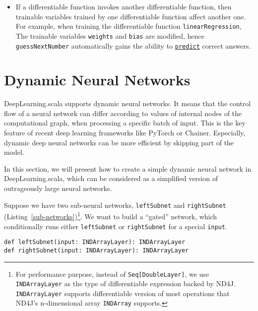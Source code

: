 \begin{itemize}
  \item If a \gls{differentiable function} invokes another \gls{differentiable function}, then \glspl{trainable variable} trained by one \gls{differentiable function} affect another one. For example, when training the \gls{differentiable function} \lstinline{linearRegression}, The \glspl{trainable variable} \lstinline{weights} and \lstinline{bias} are modified, hence \lstinline{guessNextNumber} automatically gains the ability to \href{https://javadoc.io/page/com.thoughtworks.deeplearning/deeplearning_2.11/latest/com/thoughtworks/deeplearning/DeepLearning.html#predict(differentiable:Differentiable):com.thoughtworks.future.Future[DeepLearning.this.Data]}{\lstinline{predict}} correct answers.
\end{itemize}

\section{Dynamic Neural Networks}

DeepLearning.scala supports dynamic neural networks. It means that the control flow of a neural network can differ according to values of internal nodes of the computational graph, when processing a specific batch of input. This is the key feature of recent deep learning frameworks like PyTorch\cite{paszke2017pytorch} or Chainer\cite{tokui2015chainer}. Especially, dynamic deep neural networks can be more efficient by skipping part of the model\cite{liu2017dynamic}.

In this section, we will present how to create a simple dynamic neural network in DeepLearning.scala, which can be considered as a simplified version of outrageously large neural networks\cite{shazeer2017outrageously}.

Suppose we have two sub-neural networks, \lstinline{leftSubnet} and \lstinline{rightSubnet} (Listing~\ref{sub-networks})\footnote{
  For performance purpose, instead of \lstinline{Seq[DoubleLayer]}, we use \lstinline{INDArrayLayer} as the type of \gls{differentiable expression} backed by ND4J. \lstinline{INDArrayLayer} supports differentiable version of most operations that ND4J's n-dimensional array \lstinline{INDArray} supports.
}. We want to build a ``gated'' network, which conditionally runs either \lstinline{leftSubnet} or \lstinline{rightSubnet} for a special \lstinline{input}.

\begin{lstlisting}[float={h t b p},caption={Predefined sub-networks},label={sub-networks}]
def leftSubnet(input: INDArrayLayer): INDArrayLayer
def rightSubnet(input: INDArrayLayer): INDArrayLayer
\end{lstlisting}

